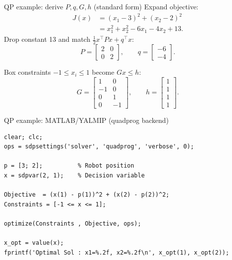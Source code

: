 \documentclass[aspectratio=169,10pt]{beamer}
\begin{document}
\begin{frame}{QP example: derive $P,q,G,h$ (standard form)}
Expand objective:
\begin{align*}
J(x) &= (x_1-3)^2+(x_2-2)^2\\
&= x_1^2+x_2^2 - 6x_1 - 4x_2 + 13.
\end{align*}
Drop constant 13 and match $\frac{1}{2}x^\top P x + q^\top x$:
\begin{equation*}
P=\begin{bmatrix}2&0\\0&2\end{bmatrix},\qquad q=\begin{bmatrix}-6\\-4\end{bmatrix}.
\end{equation*}

Box constraints $-1\le x_i\le 1$ become $Gx\le h$:
\begin{equation*}
G=\begin{bmatrix}
1&0\\-1&0\\0&1\\0&-1
\end{bmatrix},\qquad
h=\begin{bmatrix}1\\1\\1\\1\end{bmatrix}.
\end{equation*}
\end{frame}

\begin{frame}[fragile]{QP example: MATLAB/YALMIP (quadprog backend)}
\begin{lstlisting}[caption={Solving the robot distance QP using YALMIP + quadprog.}]
clear; clc;
ops = sdpsettings('solver', 'quadprog', 'verbose', 0);

p = [3; 2];          % Robot position
x = sdpvar(2, 1);    % Decision variable

Objective  = (x(1) - p(1))^2 + (x(2) - p(2))^2;
Constraints = [-1 <= x <= 1];

optimize(Constraints , Objective, ops);

x_opt = value(x);
fprintf('Optimal Sol : x1=%.2f, x2=%.2f\n', x_opt(1), x_opt(2));
\end{lstlisting}
\end{frame}
\end{document}
